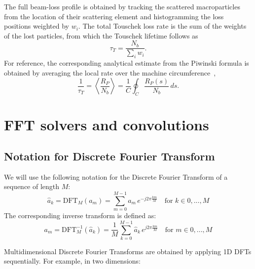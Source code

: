 The full beam-loss profile is obtained by tracking the scattered macroparticles
from the location of their scattering element and histogramming the loss
positions weighted by $w_i$. The total Touschek loss rate is the sum of the
weights of the lost particles, from which the Touschek lifetime
follows as
\begin{equation}
    \tau_T = \frac{N_b}{\sum_i w_i} .
    \label{eq:touschek_lifetime}
\end{equation}
For reference, the corresponding analytical estimate from the Piwinski formula is
obtained by averaging the local rate over the machine
circumference~\cite{Piwinski:TouschekEffect},
\begin{equation}
    \frac{1}{\tau_T} = \left\langle \frac{R_P}{N_b} \right\rangle
    = \frac{1}{C} \oint_C \frac{R_P(s)}{N_b} \, ds .
    \label{eq:touschek_piwinski_lifetime}
\end{equation}


\chapter{FFT solvers and convolutions}

\section{Notation for Discrete Fourier Transform}
We will use the following notation for the Discrete Fourier Transform of a sequence of length $M$:
\begin{equation}
\hat{a}_k = \text{DFT}_M(a_m) =  \sum_{m=0}^{M-1} a_m\, e^{-j2\pi  \frac{km}{M}}  \quad \text{for } k \in 0, ..., M
\end{equation}
The corresponding inverse transform is defined as:
\begin{equation}
{a}_m = \text{DFT}^{-1}_M(\hat{a}_k) =  \frac{1}{M}\sum_{k=0}^{M-1} \hat{a}_k\, e^{j2\pi  \frac{km}{M}}  \quad \text{for } m \in 0, ..., M
\end{equation}

Multidimensional Discrete Fourier Transforms are obtained by applying 1D DFTs sequentially. For example, in two dimensions:

